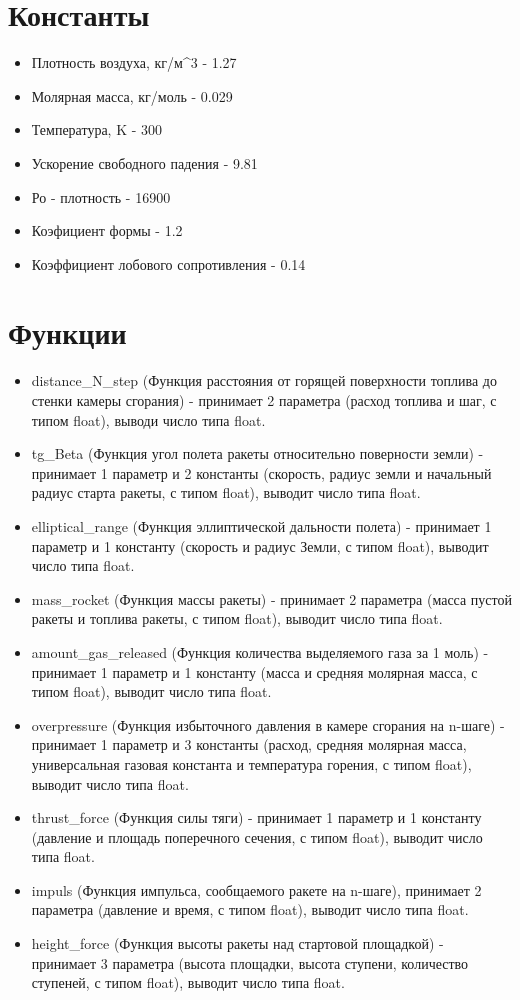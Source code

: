\documentclass[a4paper, 12pt]{report}
\begin{document}
\section{Константы}
\begin{itemize}
    \item Плотность воздуха, кг/м^{3} - 1.27
    \item Молярная масса, кг/моль - 0.029
    \item Температура, K - 300
    \item Ускорение свободного падения - 9.81
    \item Ро - плотность - 16900
    \item Коэфициент формы - 1.2
    \item Коэффициент лобового сопротивления - 0.14
\end{itemize}
\section{Функции}
\begin{itemize}
    \item distance\_N\_step (Функция расстояния от горящей поверхности топлива до стенки камеры сгорания) - принимает 2 параметра (расход топлива и шаг, с типом float), выводи число типа float.
    \item tg\_Beta (Функция угол полета ракеты относительно поверности земли) - принимает 1 параметр и 2 константы (скорость, радиус земли и начальный радиус старта ракеты, с типом float), выводит число типа float.
    \item elliptical\_range (Функция эллиптической дальности полета) - принимает 1 параметр и 1 константу (скорость и радиус Земли, с типом float), выводит число типа float.
    \item mass\_rocket (Функция массы ракеты) - принимает 2 параметра (масса пустой ракеты и топлива ракеты, с типом float), выводит число типа float.
    \item amount\_gas\_released (Функция количества выделяемого газа за 1 моль) - принимает 1 параметр и 1 константу (масса и средняя молярная масса, с типом float), выводит число типа float.
    \item overpressure (Функция избыточного давления в камере сгорания на n-шаге) - принимает 1 параметр и 3 константы (расход, средняя молярная масса, универсальная газовая константа и температура горения, с типом float), выводит число типа float.
    \item thrust\_force (Функция силы тяги) - принимает 1 параметр и 1 константу (давление и площадь поперечного сечения, с типом float), выводит число типа float.
    \item impuls (Функция импульса, сообщаемого ракете на n-шаге), принимает 2 параметра (давление и время, с типом float), выводит число типа float.
    \item height\_force (Функция высоты ракеты над стартовой площадкой) - принимает 3 параметра (высота площадки, высота ступени, количество ступеней, с типом float), выводит число типа float.
\end{itemize}
\end{document}
